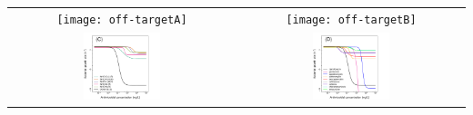 \documentclass{article}
\begin{document}


\begin{center}
\centering
\begin{tabularx}{1\textwidth}{cc}

\texttt{[image: off-targetA]}  & 
\texttt{[image: off-targetB]}\\
\includegraphics[trim = 0mm 0mm 0mm 0mm, clip,width=0.35\textwidth]{figure4C}&    
\includegraphics[trim = 0mm 0mm 0mm 0mm, clip,width=0.35\textwidth]{figure4D} \\ 
\end{tabularx}
\end{center}
\flushleft
\end{document}
